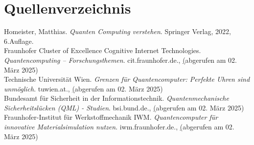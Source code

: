 \section{Quellenverzeichnis}
\label{sec:quellenverzeichnis}

Homeister, Matthias. \textit{Quanten Computing verstehen}. Springer Verlag, 2022, 6.Auflage.\\

Fraunhofer Cluster of Excellence Cognitive Internet Technologies. \textit{Quantencomputing – Forschungsthemen}. cit.fraunhofer.de., \href{https://www.cit.fraunhofer.de/de/Forschungsthemen/quantencomputing.html} (abgerufen am 02. März 2025)\\

Technische Universität Wien. \textit{Grenzen für Quantencomputer: Perfekte Uhren sind unmöglich}. tuwien.at., \href{https://www.tuwien.at/tu-wien/aktuelles/news/grenzen-fuer-quantencomputer-perfekte-uhren-sind-unmoeglich} (abgerufen am 02. März 2025)\\

Bundesamt für Sicherheit in der Informationstechnik. \textit{Quantenmechanische Sicherheitslücken (QML) - Studien}. bsi.bund.de., \href{https://www.bsi.bund.de/DE/Service-Navi/Publikationen/Studien/QML/QML_node.html} (abgerufen am 02. März 2025)\\

Fraunhofer-Institut für Werkstoffmechanik IWM. \textit{Quantencomputer für innovative Materialsimulation nutzen}. iwm.fraunhofer.de., \href{https://www.iwm.fraunhofer.de/de/geschaeftsfelder/werkstoffbewertung-lebensdauerkonzepte/materialmodellierung/quantencomputer_innovative_materialsimulation_nutzen.html} (abgerufen am 02. März 2025)\\